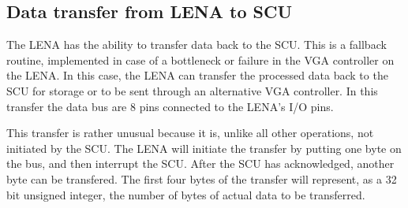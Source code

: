 \subsection{Data transfer from LENA to SCU}
The \ac{LENA} has the ability to transfer data back to the \ac{SCU}. This is a
fallback routine, implemented in case of a bottleneck or failure in the \ac{VGA}
controller on the \ac{LENA}. In this case, the \ac{LENA} can transfer the
processed data back to the \ac{SCU} for storage or to be sent through an
alternative \ac{VGA} controller. In this transfer the data bus are 8 pins
connected to the \ac{LENA}'s \ac{I/O} pins.

This transfer is rather unusual because it is, unlike all other operations, not
initiated by the \ac{SCU}. The \ac{LENA} will initiate the transfer by putting
one byte on the bus, and then interrupt the \ac{SCU}. After the \ac{SCU} has
acknowledged, another byte can be transfered. The first four bytes of the
transfer will represent, as a 32 bit unsigned integer, the number of bytes of
actual data to be transferred.

